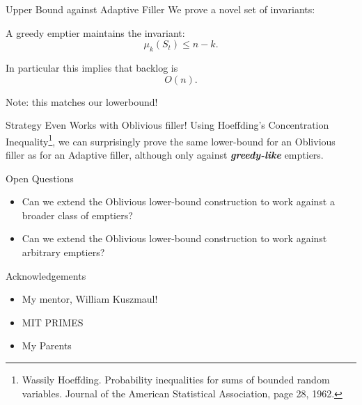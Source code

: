 \documentclass[xcolor=x11names, svgnames, rgb]{beamer}
\newcommand{\defn}[1]       {{\textit{\textbf{\boldmath #1}}}}
\begin{document}
\begin{frame}[t]{Upper Bound against Adaptive Filler}
  We prove a novel set of invariants:

  \begin{theorem}
    A greedy emptier maintains the invariant:
    $$\mu_k(S_t) \le n-k.$$
  \end{theorem}

  \vspace{0.3cm}
  In particular this implies that backlog is $$O(n).$$

  \vspace{0.3cm}
  Note: this matches our lowerbound!
  
\end{frame}

\begin{frame}[t]{Strategy Even Works with Oblivious filler!}
  Using Hoeffding's Concentration Inequality\footnote{\tiny\color{blue} Wassily
  Hoeffding. Probability inequalities for sums of bounded random variables.
Journal of the American Statistical Association, page 28, 1962.}, we can
surprisingly prove the same lower-bound for an Oblivious filler as for an
Adaptive filler, although only against \defn{greedy-like} emptiers.
\end{frame}

\begin{frame}[t]{Open Questions}
  \begin{itemize}
    \item Can we extend the Oblivious lower-bound construction to work against a broader class of emptiers?
    \item Can we extend the Oblivious lower-bound construction to work against arbitrary emptiers?
  \end{itemize}
\end{frame}

\begin{frame}[t]{Acknowledgements}
  \begin{itemize}
    \item My mentor, William Kuszmaul!
    \item MIT PRIMES
    \item My Parents
 \end{itemize} 
\end{frame}
\end{document}
